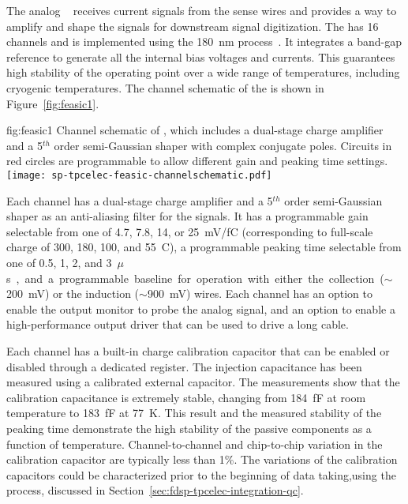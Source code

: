 The analog  ~\cite{DeGeronimo:2011zz} receives 
current signals from the  sense wires and provides a way to 
amplify and shape the signals for downstream signal digitization. 
The   has \num{16} channels and is implemented 
using the  \SI{180}{nm}  process~\cite{TSMC180}. It 
integrates a band-gap reference to generate all the internal bias 
voltages and currents. This guarantees high stability of the operating 
point over a wide range of temperatures, including cryogenic temperatures. 
The channel schematic of the   is shown in 
Figure~\ref{fig:feasic1}. 

\begin{dunefigure}
{fig:feasic1}
{Channel schematic of  , which includes a 
dual-stage charge amplifier and a \num{5}$^{th}$ order semi-Gaussian 
shaper with complex conjugate poles. Circuits in red circles are 
programmable to allow different gain and peaking time settings.}
\texttt{[image: sp-tpcelec-feasic-channelschematic.pdf]}
\end{dunefigure}

Each   channel has a dual-stage charge amplifier 
and a \num{5}$^{th}$ order semi-Gaussian shaper as an anti-aliasing 
filter for the  signals. It has a programmable gain 
selectable from one of \num{4.7}, \num{7.8}, \num{14}, or \SI{25}{mV/fC}
(corresponding to full-scale charge of \num{300}, \num{180}, \num{100}, 
and \SI{55}{C}), a programmable peaking time selectable from one of 
\num{0.5}, \num{1}, \num{2}, and \SI{3}{$\mu$s}, and a programmable 
baseline for operation with either the collection ($\sim$\SI{200}{mV}) 
or the induction ($\sim$\SI{900}{mV}) wires. Each channel has an 
option to enable the output monitor to probe the analog signal, and 
an option to enable a high-performance output driver that can be 
used to drive a long cable. 

Each   channel has a built-in charge calibration 
capacitor that can be enabled or disabled through a dedicated register. 
The injection capacitance has been measured using a calibrated external 
capacitor. The measurements show that the calibration capacitance is 
extremely stable, changing from \SI{184}{fF} at room temperature to 
\SI{183}{fF} at \SI{77}{K}. This result and the measured stability of 
the peaking time demonstrate the high stability of the passive 
components as a function of temperature. Channel-to-channel and 
chip-to-chip variation in the calibration capacitor are typically 
less than \num{1}\%. The variations of the calibration capacitors
could be characterized prior to the beginning of 
data taking,using the  process, discussed in
Section~\ref{sec:fdsp-tpcelec-integration-qc}.

